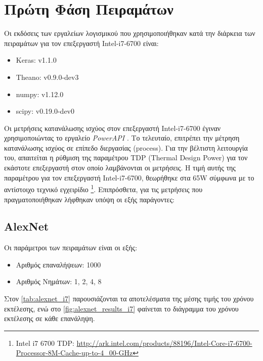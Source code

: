 \section{Πρώτη Φάση Πειραμάτων}
\label{sec:experiments_phase1}

Οι εκδόσεις των εργαλείων λογισμικού που χρησιμοποιήθηκαν
κατά την διάρκεια των πειραμάτων για τον επεξεργαστή Intel-i7-6700 είναι:
\begin{itemize}
  \item{Keras: v1.1.0}
  \item{Theano: v0.9.0-dev3}
  \item{numpy: v1.12.0}
  \item{scipy: v0.19.0-dev0}
\end{itemize}

Οι μετρήσεις κατανάλωσης ισχύος στον επεξεργαστή Intel-i7-6700 έγιναν
χρησιμοποιώντας το εργαλείο \emph{PowerAPI} \cite{grant2016standardizing}.
Το τελευταίο, επιτρέπει την μέτρηση κατανάλωσης ισχύος σε
επίπεδο διεργασίας (process). Για την βέλτιστη λειτουργία του,
απαιτείται η ρύθμιση της παραμέτρου TDP (Thermal Design Power) για τον εκάστοτε
επεξεργαστή στον οποίο λαμβάνονται οι μετρήσεις. Η τιμή αυτής της παραμέτρου για τον επεξεργαστή
Intel-i7-6700, θεωρήθηκε στα 65W σύμφωνα με το αντίστοιχο τεχνικό εγχειρίδιο
\footnote{Intel i7 6700 TDP: \url{http://ark.intel.com/products/88196/Intel-Core-i7-6700-Processor-8M-Cache-up-to-4_00-GHz}}.
Επιπρόσθετα, για τις μετρήσεις που πραγματοποιήθηκαν λήφθηκαν υπόψη οι εξής παράγοντες:
\begin{item}
  \item{}
\end{item}


\subsection{AlexNet}

Οι παράμετροι των πειραμάτων είναι οι εξής:
\begin{itemize}
  \item{Αριθμός επαναλήψεων: 1000}
  \item{Αριθμός Νημάτων: 1, 2, 4, 8}
\end{itemize}

Στον \autoref{tab:alexnet_i7} παρουσιάζονται τα αποτελέσματα της μέσης τιμής
του χρόνου εκτέλεσης, ενώ στο \autoref{fig:alexnet_results_i7} φαίνεται
το διάγραμμα του χρόνου εκτέλεσης σε κάθε επανάληψη.

